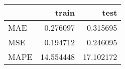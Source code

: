 \begin{tabular}{lrr}
\toprule
{} &      train &       test \\
\midrule
MAE  &   0.276097 &   0.315695 \\
MSE  &   0.194712 &   0.246095 \\
MAPE &  14.554448 &  17.102172 \\
\bottomrule
\end{tabular}
